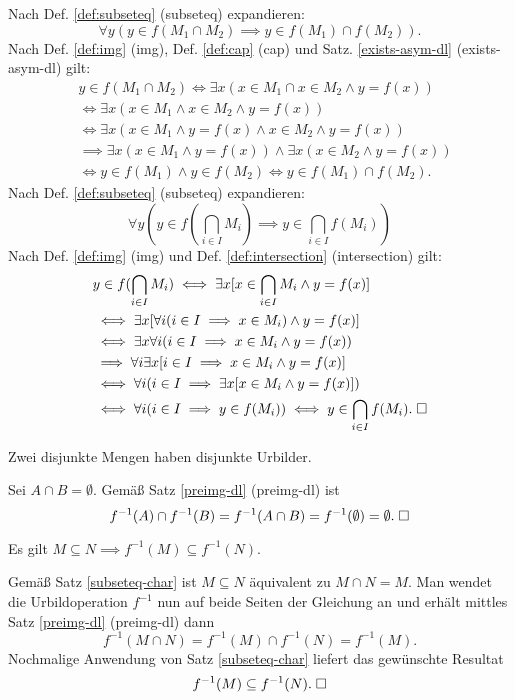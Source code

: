 \begin{Beweis}
Nach Def. \ref{def:subseteq} (subseteq) expandieren:
\[\forall y(y\in f(M_1\cap M_2)\implies y\in f(M_1)\cap f(M_2)).\]
Nach Def. \ref{def:img} (img), Def. \ref{def:cap} (cap)
und Satz. \ref{exists-asym-dl} (exists-asym-dl) gilt:
\begin{align*}
& y\in f(M_1\cap M_2) \iff \exists x(x\in M_1\cap x\in M_2\land y=f(x))\\
&\iff \exists x(x\in M_1\land x\in M_2\land y=f(x))\\
&\iff \exists x(x\in M_1\land y=f(x)\land x\in M_2\land y=f(x))\\
&\implies \exists x(x\in M_1\land y=f(x))\land\exists x(x\in M_2\land y=f(x))\\
&\iff y\in f(M_1)\land y\in f(M_2)\iff y\in f(M_1)\cap f(M_2).
\end{align*}
Nach Def. \ref{def:subseteq} (subseteq) expandieren:
\[\forall y(y\in f(\bigcap_{i\in I} M_i)\implies y\in \bigcap_{i\in I} f(M_i))\]
Nach Def. \ref{def:img} (img) und Def. \ref{def:intersection} (intersection)
gilt:
\begin{align*}
& y\in f(\bigcap_{i\in I} M_i)\iff \exists x[x\in\bigcap_{i\in I} M_i\land y=f(x)]\\
& \iff \exists x[\forall i(i\in I\implies x\in M_i)\land y=f(x)]\\
& \iff \exists x\forall i(i\in I\implies x\in M_i\land y=f(x))\\
& \implies \forall i\exists x[i\in I\implies x\in M_i\land y=f(x)]\\
& \iff \forall i(i\in I\implies \exists x[x\in M_i\land y=f(x)])\\
& \iff \forall i(i\in I\implies y\in f(M_i))
\iff y\in\bigcap_{i\in I} f(M_i).\;\square
\end{align*}
\end{Beweis}

\begin{Korollar}\label{disjoint-preimg}
Zwei disjunkte Mengen haben disjunkte Urbilder.
\end{Korollar}
\begin{Beweis} Sei $A\cap B=\emptyset$. Gemäß Satz
\ref{preimg-dl} (preimg-dl) ist
\[f^{-1}(A)\cap f^{-1}(B) = f^{-1}(A\cap B) = f^{-1}(\emptyset)
= \emptyset.\;\square\]
\end{Beweis}

\begin{Satz}
Es gilt $M\subseteq N\implies f^{-1}(M)\subseteq f^{-1}(N)$.
\end{Satz}
\begin{Beweis}[Beweis\;1]
Gemäß Satz \ref{subseteq-char} ist $M\subseteq N$ äquivalent zu
$M\cap N=M$. Man wendet die Urbildoperation $f^{-1}$ nun auf beide
Seiten der Gleichung an und erhält mittles Satz \ref{preimg-dl}
(preimg-dl) dann%
\[f^{-1}(M\cap N) = f^{-1}(M)\cap f^{-1}(N) = f^{-1}(M).\]
Nochmalige Anwendung von Satz \ref{subseteq-char} liefert
das gewünschte Resultat
\[f^{-1}(M)\subseteq f^{-1}(N).\;\square\]
\end{Beweis}

